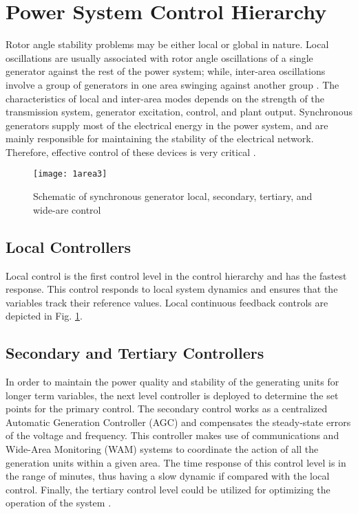 \documentclass[journal]{IEEEtran}
\begin{document}
\section{Power System Control Hierarchy}
Rotor angle stability problems may be either local or global in nature. Local oscillations are usually associated with rotor angle oscillations of a single generator against the rest of the power system; while, inter-area oscillations involve a group of generators in one area swinging against another group  \cite{dorjovchebulTPS14}. The characteristics of local and inter-area modes depends on the strength of the transmission system, generator excitation, control, and plant output. Synchronous generators supply most of the electrical energy in the power system, and are mainly responsible for maintaining the stability of the electrical network. Therefore, effective control of these devices is very critical \cite{1428005}.

\begin{figure} 
\centering
\texttt{[image: 1area3]}
\caption{Schematic of synchronous generator local, secondary, tertiary, and wide-are control} 
\label{fig:LocC}
\end{figure}

\subsection{Local Controllers}
Local control is the first control level in the control hierarchy and has the fastest response\cite{6818494}. This control responds to local system dynamics and ensures that the variables track their reference values.  Local continuous feedback controls are depicted in Fig. \ref{fig:LocC}. 


\subsection{Secondary and Tertiary Controllers}
In order to maintain the power quality and stability of the generating units for longer term variables, the next level controller is deployed to determine the set points for the primary control. The secondary control works as a centralized Automatic Generation Controller (AGC) and compensates the steady-state errors of the voltage and frequency. This controller makes use of communications and Wide-Area Monitoring (WAM) systems to coordinate the action of all the generation units within a given area. The time response of this control level is in the range of minutes, thus having a slow dynamic if compared with the local control. Finally, the tertiary control level could be utilized for optimizing the operation of the system \cite{6870484}. 
\end{document}
